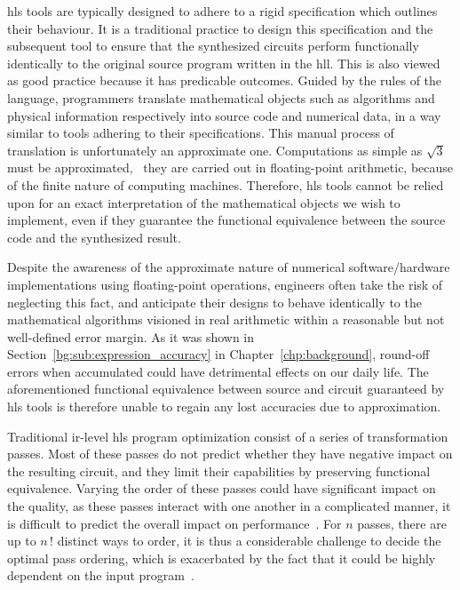 \Gls{hls} tools are typically designed to adhere to a rigid specification
which outlines their behaviour.  It is a traditional practice to design
this specification and the subsequent tool to ensure that the synthesized
circuits perform functionally identically to the original source program
written in the \gls{hll}.  This is also viewed as good practice because it
has predicable outcomes.  Guided by the rules of the language, programmers
translate mathematical objects such as algorithms and physical information
respectively into source code and numerical data, in a way similar to tools
adhering to their specifications.  This manual process of translation is
unfortunately an approximate one.  Computations as simple as $\sqrt{3}$ must be
approximated, \eg~they are carried out in floating-point arithmetic, because of
the finite nature of computing machines.  Therefore, \gls{hls} tools cannot be
relied upon for an exact interpretation of the mathematical objects we wish to
implement, even if they guarantee the functional equivalence between the source
code and the synthesized result.

Despite the awareness of the approximate nature of numerical software/hardware
implementations using floating-point operations, engineers often take
the risk of neglecting this fact, and anticipate their designs to behave
identically to the mathematical algorithms visioned in real arithmetic
within a reasonable but not well-defined error margin.  As it was shown in
Section~\ref{bg:sub:expression_accuracy} in Chapter~\ref{chp:background},
round-off errors when accumulated could have detrimental effects on our daily
life.  The aforementioned functional equivalence between source and circuit
guaranteed by \gls{hls} tools is therefore unable to regain any lost accuracies
due to approximation.

Traditional \gls{ir}-level \gls{hls} program optimization consist of a series
of transformation passes.  Most of these passes do not predict whether
they have negative impact on the resulting circuit, and they limit their
capabilities by preserving functional equivalence.  Varying the order of these
passes could have significant impact on the quality, as these passes interact
with one another in a complicated manner, it is difficult to predict the
overall impact on performance~\cite{huang15}.  For $n$ passes, there are up to
$n{\,!}$ distinct ways to order, it is thus a considerable challenge to decide
the optimal pass ordering, which is exacerbated by the fact that it could be
highly dependent on the input program~\cite{cong13}.

